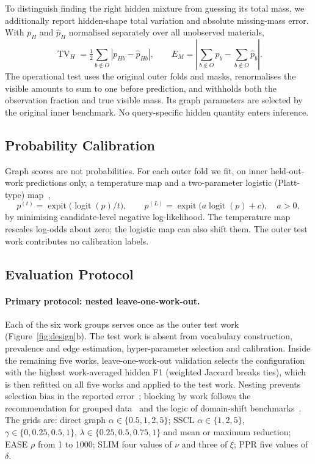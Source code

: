 \documentclass[applsci,article,submit,oneauthor]{Definitions/mdpi}
\newcommand{\logit}{\operatorname{logit}}
\newcommand{\expit}{\operatorname{expit}}
\begin{document}
To distinguish finding the right hidden mixture from guessing its total mass, we additionally report hidden-shape total variation and absolute missing-mass error. With $p_H$ and $\widehat p_H$ normalised separately over all unobserved materials,
\begin{equation}
\operatorname{TV}_H=\tfrac12\sum_{b\notin O}|p_{Hb}-\widehat p_{Hb}|,\qquad
E_M=\left|\sum_{b\notin O}p_b-\sum_{b\notin O}\widehat p_b\right|.
\label{eq:hidden-metrics}
\end{equation}
The operational test uses the original outer folds and masks, renormalises the visible amounts to sum to one before prediction, and withholds both the observation fraction and true visible mass. Its graph parameters are selected by the original inner benchmark. No query-specific hidden quantity enters inference.


\subsection{Probability Calibration}
\label{sec:calib}

Graph scores are not probabilities. For each outer fold we fit, on inner held-out-work predictions only, a temperature map and a two-parameter logistic (Platt-type) map~\cite{guo2017,platt1999},
\begin{equation}
p^{(t)}=\expit\bigl(\logit(p)/t\bigr),\qquad p^{(L)}=\expit\bigl(a\logit(p)+c\bigr),\quad a>0,
\label{eq:calib}
\end{equation}
by minimising candidate-level negative log-likelihood. The temperature map rescales log-odds about zero; the logistic map can also shift them. The outer test work contributes no calibration labels.

\subsection{Evaluation Protocol}
\label{sec:protocol}

\paragraph{Primary protocol: nested leave-one-work-out.} Each of the six work groups serves once as the outer test work (Figure~\ref{fig:design}b). The test work is absent from vocabulary construction, prevalence and edge estimation, hyper-parameter selection and calibration. Inside the remaining five works, leave-one-work-out validation selects the configuration with the highest work-averaged hidden F1 (weighted Jaccard breaks ties), which is then refitted on all five works and applied to the test work. Nesting prevents selection bias in the reported error~\cite{varma2006}; blocking by work follows the recommendation for grouped data~\cite{roberts2017} and the logic of domain-shift benchmarks~\cite{koh2021,wu2023}. The grids are: direct graph $\alpha\in\{0.5,1,2,5\}$; SSCL $\alpha\in\{1,2,5\}$, $\gamma\in\{0,0.25,0.5,1\}$, $\lambda\in\{0.25,0.5,0.75,1\}$ and mean or maximum reduction; EASE $\rho$ from 1 to 1000; SLIM four values of $\nu$ and three of $\xi$; PPR five values of $\delta$.
\end{document}
